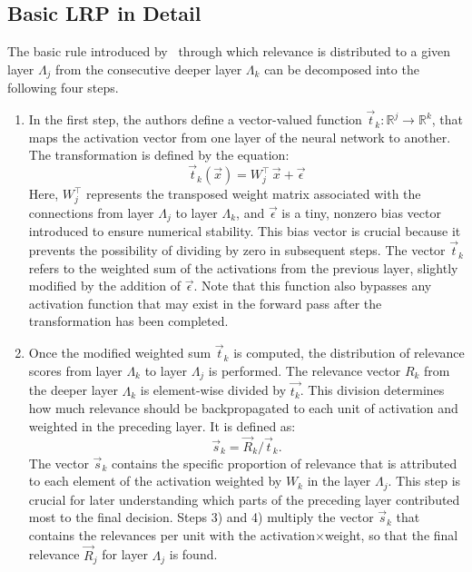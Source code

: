 \subsection{Basic LRP in Detail}
\label{lrp}
The basic \LRP\/ rule introduced by~\cite{bach2015pixel} through which relevance is distributed to a given layer $\Lambda_j$ from the consecutive deeper layer $\Lambda_k$ can be decomposed into the following four steps. 

\begin{enumerate}
    \item In the first step, the authors define a vector-valued function $\vec{t}_k:\mathbb{R}^j\to\mathbb{R}^k$, that maps the activation vector from one layer of the neural network to another. The transformation is defined by the equation:
\begin{equation*}
    \vec{t}_k(\vec{x}) = W_j^\intercal\, \vec{x} + \vec{\epsilon}
\end{equation*}
   Here, $W_j^\intercal$ represents the transposed weight matrix associated with the connections from layer $\Lambda_j$ to layer $\Lambda_k$, and $\vec{\epsilon}$ is a tiny, nonzero bias vector introduced to ensure numerical stability. This bias vector is crucial because it prevents the possibility of dividing by zero in subsequent steps. The vector $\vec{t}_k$ refers to the weighted sum of the activations from the previous layer, slightly modified by the addition of $\vec{\epsilon}$. Note that this function also bypasses any activation function that may exist in the forward pass after the transformation has been completed.
   \item Once the modified weighted sum $\vec{t}_k$ is computed, the distribution of relevance scores from layer $\Lambda_k$ to layer $\Lambda_j$ is performed. The relevance vector $R_k$ from the deeper layer $\Lambda_k$ is element-wise divided by $\vec{t_k}$. This division determines how much relevance should be backpropagated to each unit of activation and weighted in the preceding layer. It is defined as:
\begin{equation*}
   \vec{s}_k = \vec{R}_k / \vec{t}_k.
\end{equation*} 
   The vector $\vec{s}_k$ contains the specific proportion of relevance that is attributed to each element of the activation weighted by $W_k$ in the layer $\Lambda_j$. This step is crucial for later understanding which parts of the preceding layer contributed most to the final decision.
   Steps 3) and 4) multiply the vector $\vec{s}_k$ that contains the relevances per unit with the activation$\times$weight, so that the final relevance $\vec{R}_j$ for layer $\Lambda_j$ is found.

\end{enumerate}
